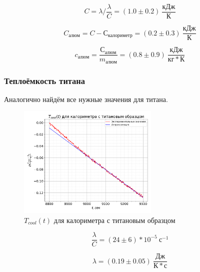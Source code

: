 \documentclass[a4paper, 12pt]{article}
\begin{document}
                \begin{equation*}
                    C = \lambda / \frac{\lambda}{C} = (1.0 \pm 0.2)~\frac{кДж}{К}
                \end{equation*}

                \begin{equation*}
                    C_{алюм} = C - С_{калориметр} = (0.2 \pm 0.3)~\frac{кДж}{К}
                \end{equation*}

                \begin{equation*}
                    c_{алюм} = \frac{С_{алюм}}{m_{алюм}} = (0.8 \pm 0.9)~\frac{кДж}{кг*К}
                \end{equation*}

            \subsubsection{Теплоёмкость титана}

                Аналогично найдём все нужные значения для титана.

                \begin{figure}[ht]
                    \centering
                    \includegraphics[width=0.6\textwidth]{img/graph_cool_3.png}
                    \caption{$T_{cool}(t)$ для калориметра с титановым образцом}
                    \label{plot:T_cool_3}
                \end{figure}

                \begin{equation*}
                    \frac{\lambda}{C} = (24 \pm 6)*10^{-5}~с^{-1}
                \end{equation*}

                \begin{equation*}
                    \lambda = (0.19 \pm 0.05)~\frac{Дж}{К*с}
                \end{equation*}
\end{document}
